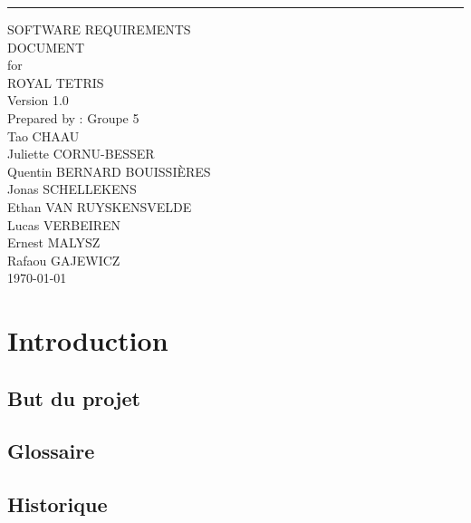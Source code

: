 \documentclass{scrreprt}
\date{}
\def\myversion{1.0 }
\begin{document}
\begin{flushright}
    \rule{16cm}{5pt}\vskip1cm
    \begin{bfseries}
        \Huge{SOFTWARE REQUIREMENTS\\ DOCUMENT}\\
        \vspace{1cm}
        for\\
        \vspace{1cm}
        ROYAL TETRIS\\
        \vspace{1cm}
        \LARGE{Version \myversion}\\
        \vspace{1cm}
        Prepared by : Groupe 5 \\
        Tao CHAAU \\
        Juliette CORNU-BESSER \\
        Quentin BERNARD BOUISSIÈRES \\
        Jonas SCHELLEKENS \\
        Ethan VAN RUYSKENSVELDE \\
        Lucas VERBEIREN \\
        Ernest MALYSZ \\
        Rafaou GAJEWICZ \\
        \vspace{1cm}
        \today\\
    \end{bfseries}
\end{flushright}

\tableofcontents

\chapter{Introduction}

\section{But du projet}


\section{Glossaire}


\section{Historique}
\end{document}
